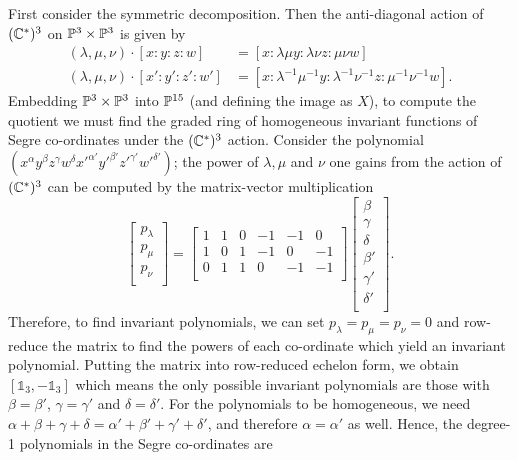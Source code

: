 	
	First consider the symmetric decomposition. Then the anti-diagonal action of $(\mathbb{C}^\ast)^3$ on $\mathbb{P}^3\times \mathbb{P}^3$ is given by
	\begin{align*}
		(\lambda, \mu,\nu)\cdot [x:y:z:w] &= [x:\lambda \mu y: \lambda \nu z: \mu\nu w]\\
		(\lambda, \mu,\nu)\cdot [x':y':z':w'] &= [x:\lambda^{-1} \mu^{-1} y: \lambda^{-1} \nu^{-1} z: \mu^{-1}\nu^{-1} w].
	\end{align*}
	Embedding $\mathbb{P}^3\times \mathbb{P}^3$ into $\mathbb{P}^{15}$ (and defining the image as $X$), to compute the quotient we must find the graded ring of homogeneous invariant functions of Segre co-ordinates under the $(\mathbb{C}^\ast)^3$ action. Consider the polynomial $(x^\alpha y^\beta z^\gamma w^\delta x'^{\alpha'} y'^{\beta'} z'^{\gamma'} w'^{\delta'})$; the power of $\lambda,\mu$ and $\nu$ one gains from the action of $(\mathbb{C}^\ast)^3$ can be computed by the matrix-vector multiplication
	\begin{equation}
		\begin{bmatrix}
		p_\lambda \\
		p_\mu \\
		p_\nu \\
		\end{bmatrix} = \begin{bmatrix}
		1 & 1 & 0 & -1 & -1 & 0\\
		1 & 0 & 1 & -1 & 0 & -1\\
		0 & 1 & 1 & 0 & -1 & - 1\\
		\end{bmatrix}\begin{bmatrix}
		\beta \\
		\gamma \\
		\delta \\
		\beta' \\
		\gamma'\\
		\delta '\\
		\end{bmatrix}.
	\end{equation}
	Therefore, to find invariant polynomials, we can set $p_\lambda = p_\mu = p_\nu =0$ and row-reduce the matrix to find the powers of each co-ordinate which yield an invariant polynomial. Putting the matrix into row-reduced echelon form, we obtain $[\mathds{1}_{3}, -\mathds{1}_3]$ which means the only possible invariant polynomials are those with $\beta = \beta'$, $\gamma = \gamma'$ and $\delta = \delta'$. For the polynomials to be homogeneous, we need $\alpha+\beta+\gamma+\delta = \alpha'+\beta'+\gamma'+\delta'$, and therefore $\alpha = \alpha'$ as well. Hence, the degree-1 polynomials in the Segre co-ordinates are
